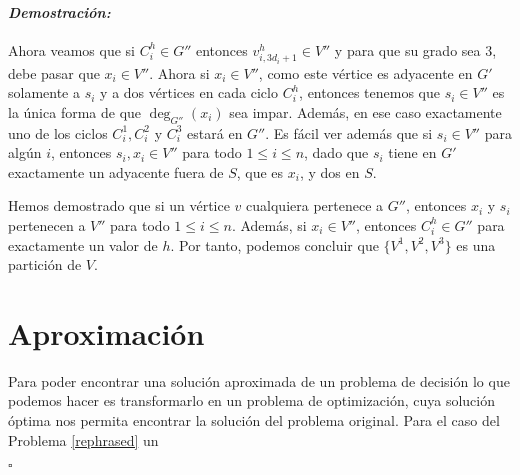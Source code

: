 \documentclass[10pt]{amsart}
\theoremstyle{definition}
\numberwithin{equation}{section}
\newenvironment{myproof} {\paragraph{\emph{Demostraci\'on:}}}{\hfill$\square$}
\begin{document}
\begin{myproof}
	Ahora veamos que si $C_i^h \in G''$ entonces $v_{i,3d_i + 1}^h \in V''$ y para que su grado sea $3$, debe pasar que $x_i \in V''$. Ahora si $x_i \in V''$, como este v\'ertice es adyacente en $G'$ solamente a $s_i$ y a dos v\'ertices en cada ciclo $C_i^h$, entonces tenemos que $s_i \in V''$ es la \'unica forma de que $\deg_{G''}(x_i)$ sea impar. Adem\'as, en ese caso exactamente uno de los ciclos $C_i^1, C_i^2$ y $C_i^3$ estar\'a en $G''$. Es f\'acil ver adem\'as que si $s_i \in V''$ para alg\'un $i$, entonces $s_i, x_i \in V''$ para todo $1 \le i \le n$, dado que $s_i$ tiene en $G'$ exactamente un adyacente fuera de $S$, que es $x_i$, y dos en $S$.
	
	Hemos demostrado que si un v\'ertice $v$ cualquiera pertenece a $G''$, entonces $x_i$ y  $s_i$ pertenecen a $V''$ para todo $1 \le i \le n$. Adem\'as, si $x_i \in V''$, entonces $C_i^h \in G''$ para exactamente un valor de $h$.  Por tanto, podemos concluir que $\{V^1, V^2, V^3\}$ es una partici\'on de $V$. 
	
	
	\section{Aproximaci\'on}
	
	Para  poder encontrar una soluci\'on aproximada de un problema de decisi\'on lo que podemos hacer es transformarlo en un problema de optimizaci\'on, cuya soluci\'on \'optima nos permita encontrar la soluci\'on del problema original. Para el caso del Problema \ref{rephrased} un 
	
	
\end{myproof}
\end{document}
